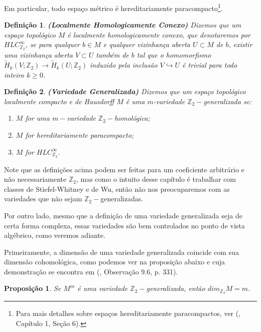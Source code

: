 \documentclass[12pt,oneside]{book} %
\newtheorem{defi}   {\hspace{0.5cm}Defini\c c\~ao}[chapter]
\newtheorem{prop}   {\hspace{0.5cm}Proposi\c c\~ao}[chapter]
\newcommand{\Z}{\mathbb{Z}}
\newcommand{\wt}{\widetilde}
\begin{document}
\par Em particular, todo espaço métrico é hereditariamente paracompacto\footnote{Para mais detalhes sobre espaços hereditariamente paracompactos, ver (\cite{bredon_2}, Capítulo 1, Seção 6).}.

\begin{defi}{\bf (Localmente Homologicamente Conexo)}
Dizemos que um espaço topológico $M$ é localmente homologicamente conexo, que denotaremos por $HLC_{\Z_{2}}^{\infty}$\index{HLC$_{\Z_{2}}^{\infty}$}, se para qualquer $b\in M$ e qualquer vizinhança aberta $U\subset M$ de $b$, existir uma vizinhança aberta $V\subset U$ também de $b$ tal que o homomorfismo $\wt{H}_{k}(V;\Z_{2})\to \wt{H}_{k}(U;\Z_{2})$ induzido pela inclusão $V\hookrightarrow U$ é trivial para todo inteiro $k\geq 0$.
\end{defi}

\begin{defi}{\bf (Variedade Generalizada)}
Dizemos que um espaço topológico localmente compacto e de Hausdorff $M$ é uma $m$-variedade $\Z_{2}-$generalizada se:
	\begin{enumerate}
		\item $M$ for uma $m-$variedade $\Z_{2}-$homológica;
		\item $M$ for hereditariamente paracompacto;
		\item $M$ for $HLC_{\Z_{2}}^{\infty}$.
	\end{enumerate}
\end{defi}

\par Note que as definições acima podem ser feitas para um coeficiente arbitrário e não necessariamente $\Z_{2}$, mas como o intuito desse capítulo é trabalhar com classes de Stiefel-Whitney e de Wu, então não nos preocuparemos com as variedades que não sejam $\Z_{2}-$generalizadas.

\par Por outro lado, mesmo que a definição de uma variedade generalizada seja de certa forma complexa, essas variedades são bem controlados no ponto de vista algébrico, como veremos adiante.

\par Primeiramente, a dimensão de uma variedade generalizada coincide com sua dimensão cohomológica, como podemos ver na proposição abaixo e cuja demonstração se encontra em (\cite{bredon_2}, Observação 9.6, p. 331).

\begin{prop}
Se $M^{m}$ é uma variedade $\Z_{2}-$generalizada, então $dim_{\Z_{2}}M=m$.
\end{prop}
\end{document}
